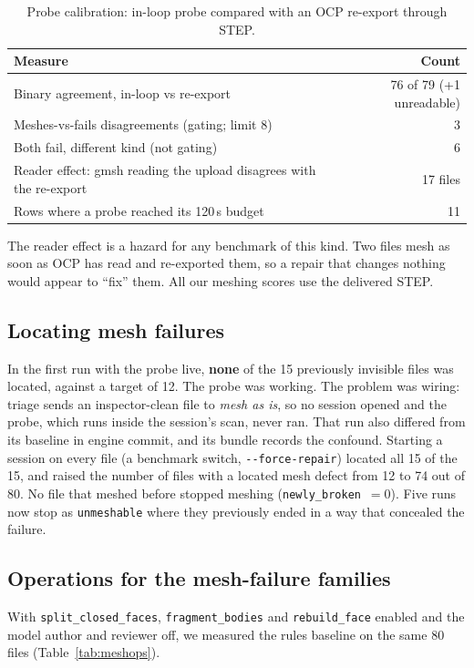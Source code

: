 \documentclass[11pt,onecolumn]{article}
\newcommand{\code}[1]{\texttt{\small #1}}
\begin{document}
\begin{table}[t]
\centering
\caption{Probe calibration: in-loop probe compared with an OCP re-export through STEP.}
\label{tab:calib}
\small
\begin{tabularx}{\textwidth}{@{}X r@{}}
\toprule
\textbf{Measure} & \textbf{Count}\\
\midrule
Binary agreement, in-loop vs re-export                                & 76 of 79 (+1 unreadable)\\
Meshes-vs-fails disagreements (gating; limit 8)                       & 3\\
Both fail, different kind (not gating)                                & 6\\
Reader effect: gmsh reading the upload disagrees with the re-export   & 17 files\\
Rows where a probe reached its 120\,s budget                          & 11\\
\bottomrule
\end{tabularx}
\end{table}

The reader effect is a hazard for any benchmark of this kind. Two files mesh as soon as OCP has read
and re-exported them, so a repair that changes nothing would appear to ``fix'' them. All our meshing
scores use the delivered STEP.

\subsection{Locating mesh failures}\label{sec:locate}
In the first run with the probe live, \textbf{none} of the 15 previously invisible files was
located, against a target of 12. The probe was working. The problem was wiring: triage sends an
inspector-clean file to \emph{mesh as is}, so no session opened and the probe, which runs inside the
session's scan, never ran. That run also differed from its baseline in engine commit, and its bundle
records the confound. Starting a session on every file (a benchmark switch,
\code{-{}-force-repair}) located all 15 of the 15, and raised the number of files with a located
mesh defect from 12 to 74 out of 80. No file that meshed before stopped meshing
(\code{newly\_broken}~$=0$). Five runs now stop as \code{unmeshable} where they previously ended in
a way that concealed the failure.

\subsection{Operations for the mesh-failure families}
With \code{split\_closed\_faces}, \code{fragment\_bodies} and \code{rebuild\_face} enabled and the
model author and reviewer off, we measured the rules baseline on the same 80 files
(Table~\ref{tab:meshops}).
\end{document}
